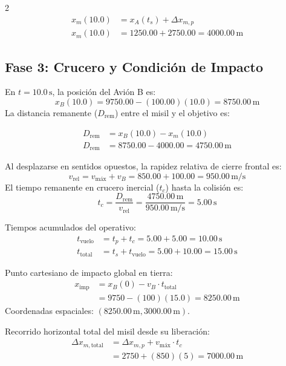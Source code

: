 \documentclass[11pt,letterpaper]{article}
\begin{document}
\begin{multicols}{2}
\begin{align}
    x_m(10.0) &= x_A(t_s) + \Delta x_{m,p} \\
    x_m(10.0) &= 1250.00 + 2750.00 = 4000.00\,\text{m}
\end{align}

\subsection{Fase 3: Crucero y Condición de Impacto}
En $t = 10.0\,\text{s}$, la posición del Avión B es:
\begin{equation}
    x_B(10.0) = 9750.00 - (100.00)(10.0) = 8750.00\,\text{m}
\end{equation}
La distancia remanente ($D_{\text{rem}}$) entre el misil y el objetivo es:

\begin{align*}
    D_{\text{rem}} &= x_B(10.0) - x_m(10.0) \\
    D_{\text{rem}} &= 8750.00 - 4000.00 = 4750.00\,\text{m}
\end{align*}

Al desplazarse en sentidos opuestos, la rapidez relativa de cierre frontal es:
\begin{equation}
    v_{\text{rel}} = v_{\text{máx}} + v_B = 850.00 + 100.00 = 950.00\,\text{m/s}
\end{equation}
El tiempo remanente en crucero inercial ($t_c$) hasta la colisión es:
\begin{equation}
    t_c = \frac{D_{\text{rem}}}{v_{\text{rel}}} = \frac{4750.00\,\text{m}}{950.00\,\text{m/s}} = 5.00\,\text{s} \label{eq:tc}
\end{equation}

Tiempos acumulados del operativo:
\begin{align}
    t_{\text{vuelo}} &= t_p + t_c = 5.00 + 5.00 = 10.00\,\text{s} \label{eq:tvuelo}\\
    t_{\text{total}} &= t_s + t_{\text{vuelo}} = 5.00 + 10.00 = 15.00\,\text{s} \label{eq:ttotal}
\end{align}

Punto cartesiano de impacto global en tierra:
\begin{align}
    x_{\text{imp}} &= x_B(0) - v_B \cdot t_{\text{total}} \nonumber \\
    &= 9750 - (100)(15.0) = 8250.00\,\text{m} \label{eq:ximp}
\end{align}
Coordenadas espaciales: $(8250.00\,\text{m}, 3000.00\,\text{m})$.

Recorrido horizontal total del misil desde su liberación:
\begin{align}
    \Delta x_{m,\text{total}} &= \Delta x_{m,p} + v_{\text{máx}} \cdot t_c \nonumber \\
    &= 2750 + (850)(5) = 7000.00\,\text{m} \label{eq:dx_total}
\end{align}


\end{multicols}
\end{document}
